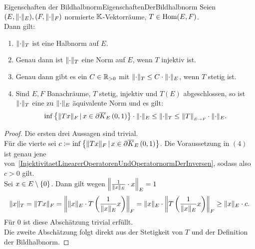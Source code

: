 \begin{lemma}{Eigenschaften der Bildhalbnorm}{EigenschaftenDerBildhalbnorm}
Seien $(E, \lVert\cdot\rVert_E), (F, \lVert\cdot\rVert_F)$ normierte $\mathbb{K}$-Vektorräume,
$T \in \mathop{\textrm{Hom}}\nolimits(E, F)$.\\
Dann gilt:
\begin{enumerate}[(1)]
 \item \label{EigenschaftenDerBildhalbnorm1}
 $\lVert\cdot\rVert_T$ ist eine Halbnorm auf $E$.
 \item\label{EigenschaftenDerBildhalbnorm2}
 Genau dann ist $\lVert\cdot\rVert_T$ eine Norm auf $E$, wenn $T$ injektiv ist.
 \item\label{EigenschaftenDerBildhalbnorm3}
 Genau dann gibt es ein $C \in \mathbb{R}_{>0}$
    mit $\lVert\cdot\rVert_T \le C\cdot\lVert\cdot\rVert_E$, wenn $T$ stetig ist.
 \item\label{EigenschaftenDerBildhalbnorm4}
 Sind $E, F$ Banachräume, $T$ stetig, injektiv und $T(E)$ abgeschlossen, so
    ist $\lVert\cdot\rVert_T$ eine zu $\lVert\cdot\rVert_E$ äquivalente Norm und es gilt:
    \[\inf\left\{ \lVert Tx\rVert_F \,|\,x \in \partial \overline K_{E}\left(0, 1\right)\right\} \cdot \lVert\cdot\rVert_E
    \le \lVert\cdot\rVert_T \le \left\|T\right\|_{\scriptscriptstyle{E \rightarrow F}} \cdot \lVert\cdot\rVert _E\text.\]
\end{enumerate}
\end{lemma}
\begin{proof}
Die ersten drei Aussagen sind trivial.\\
Für die vierte sei $c \coloneqq  \inf\left\{ \lVert Tx\rVert_F \,|\,x \in \partial \overline K_{E}\left(0, 1\right)\right\}$.
Die Voraussetzung in $(4)$ ist genau jene von~\ref{InjektivitaetLinearerOperatorenUndOperatornormDerInversen},
sodass also $c > 0$ gilt.\\
Sei $x \in E\setminus\left\{0\right\}$.
Dann gilt wegen $\left\|\frac 1 {\lVert x\rVert_E} \cdot x\right\|_E = 1$
\begin{align*} \lVert x\rVert _T = \lVert Tx\rVert_F 
  = \left\|\lVert x\rVert _E\cdot T\left(\frac 1 {\lVert x\rVert _E}x \right)\right\|_F
  = \lVert x\rVert _E \cdot \left\|T\left(\frac 1 {\lVert x\rVert _E}x \right)\right\|_F
  \ge \lVert x\rVert _E \cdot c\text.\end{align*}
Für $0$ ist diese Abschätzung trivial erfüllt.\\
Die zweite Abschätzung folgt direkt aus der Stetigkeit von $T$ und der
Definition der Bildhalbnorm.
\end{proof}